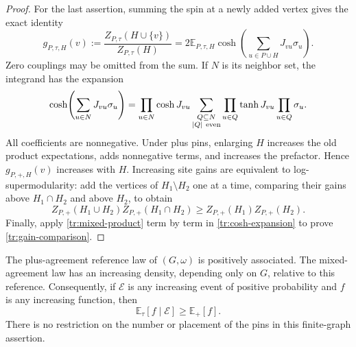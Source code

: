 \begin{proof}
For the last assertion, summing the spin at a newly added vertex gives the
exact identity
\begin{equation}
\label{tr:site-gain-formula}
 g_{P,\tau,H}(v):=
 \frac{Z_{P,\tau}(H\cup\{v\})}{Z_{P,\tau}(H)}
 =2\mathbb E_{P,\tau,H}
 \cosh\!\left(\sum_{u\in P\cup H}J_{vu}\sigma_u\right).
\end{equation}
Zero couplings may be omitted from the sum. If $N$ is its neighbor set,
the integrand has the expansion
\begin{equation}
\label{tr:cosh-expansion}
 \cosh\!\left(\sum_{u\in N}J_{vu}\sigma_u\right)
 =\prod_{u\in N}\cosh J_{vu}
 \sum_{\substack{Q\subseteq N\\ |Q|\ {\rm even}}}
 \prod_{u\in Q}\tanh J_{vu}\prod_{u\in Q}\sigma_u.
\end{equation}
All coefficients are nonnegative. Under plus pins, enlarging $H$ increases
the old product expectations, adds nonnegative terms, and increases the
prefactor. Hence $g_{P,+,H}(v)$ increases with $H$. Increasing site gains are
equivalent to log-supermodularity: add the vertices of $H_1\setminus H_2$
one at a time, comparing their gains above $H_1\cap H_2$ and above $H_2$,
to obtain
\[
 Z_{P,+}(H_1\cup H_2)Z_{P,+}(H_1\cap H_2)
 \geq Z_{P,+}(H_1)Z_{P,+}(H_2).
\]
Finally, apply \eqref{tr:mixed-product} term by term in
\eqref{tr:cosh-expansion} to prove \eqref{tr:gain-comparison}.
\end{proof}

\begin{lemma}
\label{tr:increasing-conditioning}
The plus-agreement reference law of $(G,\omega)$ is positively associated.
The mixed-agreement law has an increasing density, depending only on $G$,
relative to this reference. Consequently, if $\mathcal E$ is any increasing
event of positive probability and $f$ is any increasing function, then
\begin{equation}
\label{tr:conditional-reference}
 \mathbb E_\tau[f\mid\mathcal E]\geq\mathbb E_+[f].
\end{equation}
There is no restriction on the number or placement of the pins in this
finite-graph assertion.
\end{lemma}

